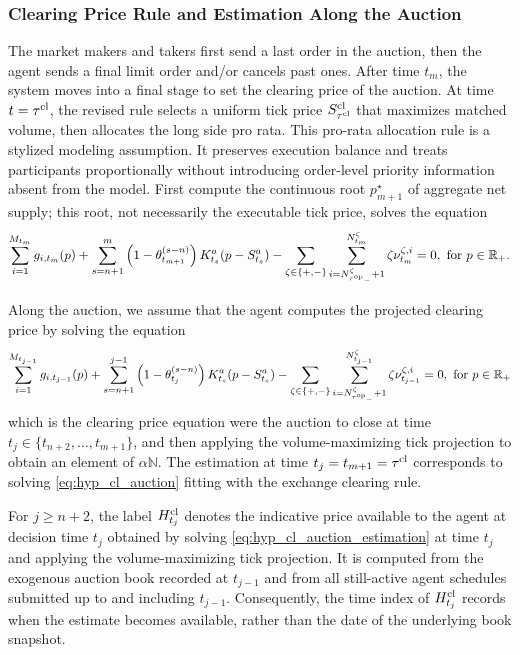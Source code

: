 \documentclass[11pt]{article}
\begin{document}
\subsubsection{Clearing Price Rule and Estimation Along the Auction}\label{sec:clearing}

The market makers and takers first send a last order in the auction, then the agent sends a final limit order and/or cancels past ones. After time $t_m$, the system moves into a final stage to set the clearing price of the auction. {At time $t=\tau^{\mathrm{cl}}$, the revised rule selects a uniform tick price $S_{\tau^{\mathrm{cl}}}^{\mathrm{cl}}$ that maximizes matched volume, then allocates the long side pro rata. This pro-rata allocation rule is a stylized modeling assumption. It preserves execution balance and treats participants proportionally without introducing order-level priority information absent from the model. First compute the continuous root $p_{m+1}^\star$ of aggregate net supply; this root, not necessarily the executable tick price, solves the equation}
\begin{equation}
\label{eq:hyp_cl_auction}
    \sum_{i = 1}^{M_{t_m}}g_{i,t_m}(p) + \sum_{s=n+1}^{m} \left(1-\theta_{t_{m+1}}^{(s-n)}\right)K_{t_s}^a(p-S_{t_s}^a)- \sum_{\zeta \in \{+,-\}}\sum_{i=N_{{\tau^{\mathrm{op}}}_-}^\zeta+1}^{N_{t_m}^\zeta} \zeta \nu_{t_m}^{\zeta,i}= 0,\text{ for } p\in \mathbb{R}_+.
\end{equation}

Along the auction, we assume that the agent computes the projected clearing price by solving the equation
\begin{equation}
\label{eq:hyp_cl_auction_estimation}
    \sum_{i = 1}^{M_{t_{j-1}}}g_{i,t_{j-1}}(p) + \sum_{s=n+1}^{j-1} \left(1-\theta_{t_j}^{(s-n)}\right)K_{t_s}^a(p-S_{t_s}^a)- \sum_{\zeta \in \{+,-\}}\sum_{i={N_{{\tau^{\mathrm{op}}}_-}^\zeta+1}}^{N_{t_{j-1}}^\zeta} \zeta \nu_{t_{j-1}}^{\zeta,i}= 0,\text{ for } p\in \mathbb{R}_+
\end{equation}
which is the clearing price equation were the auction to close at time $t_j \in \{t_{n+2},\ldots, t_{m+1}\}$, and then applying the volume-maximizing tick projection to obtain an element of $\alpha \mathbb{N}$. The estimation at time $t_j=t_{m+1}=\tau^{\mathrm{cl}}$ corresponds to solving \eqref{eq:hyp_cl_auction} fitting with the exchange clearing rule.

\begin{remark}
For $j\geqslant  n+2$, the label $H_{t_j}^{\mathrm{cl}}$ denotes the indicative price available to the agent at decision time $t_j$ obtained by solving \eqref{eq:hyp_cl_auction_estimation} at time $t_j$ and applying the volume-maximizing tick projection. It is computed from the exogenous auction book recorded at $t_{j-1}$ and from all still-active agent schedules submitted up to and including $t_{j-1}$. Consequently, the time index of $H_{t_j}^{\mathrm{cl}}$ records when the estimate becomes available, rather than the date of the underlying book snapshot.
\end{remark}
\end{document}
